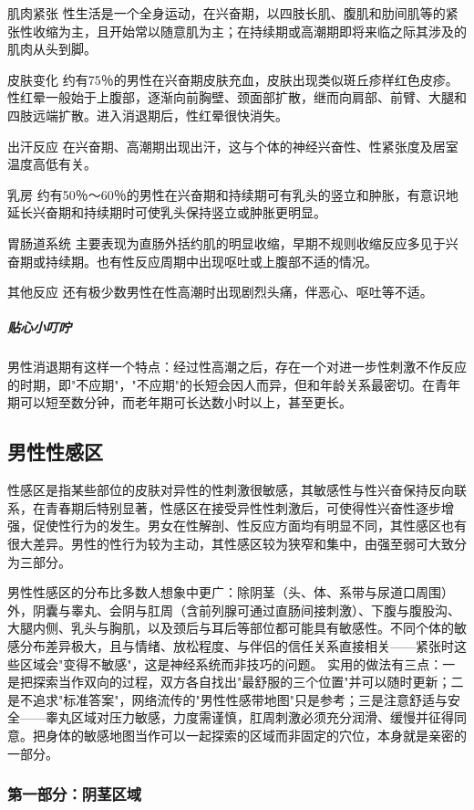 肌肉紧张
性生活是一个全身运动，在兴奋期，以四肢长肌、腹肌和肋间肌等的紧张性收缩为主，且开始常以随意肌为主；在持续期或高潮期即将来临之际其涉及的肌肉从头到脚。

皮肤变化
约有75％的男性在兴奋期皮肤充血，皮肤出现类似斑丘疹样红色皮疹。性红晕一般始于上腹部，逐渐向前胸壁、颈面部扩散，继而向肩部、前臂、大腿和四肢远端扩散。进入消退期后，性红晕很快消失。

出汗反应
在兴奋期、高潮期出现出汗，这与个体的神经兴奋性、性紧张度及居室温度高低有关。

乳房
约有50％～60％的男性在兴奋期和持续期可有乳头的竖立和肿胀，有意识地延长兴奋期和持续期时可使乳头保持竖立或肿胀更明显。

胃肠道系统
主要表现为直肠外括约肌的明显收缩，早期不规则收缩反应多见于兴奋期或持续期。也有性反应周期中出现呕吐或上腹部不适的情况。

其他反应
还有极少数男性在性高潮时出现剧烈头痛，伴恶心、呕吐等不适。

\subparagraph{贴心小叮咛}

男性消退期有这样一个特点：经过性高潮之后，存在一个对进一步性刺激不作反应的时期，即"不应期"，"不应期"的长短会因人而异，但和年龄关系最密切。在青年期可以短至数分钟，而老年期可长达数小时以上，甚至更长。

\subsection{男性性感区}

性感区是指某些部位的皮肤对异性的性刺激很敏感，其敏感性与性兴奋保持反向联系，在青春期后特别显著，性感区在接受异性性刺激后，可使得性兴奋性逐步增强，促使性行为的发生。男女在性解剖、性反应方面均有明显不同，其性感区也有很大差异。男性的性行为较为主动，其性感区较为狭窄和集中，由强至弱可大致分为三部分。


男性性感区的分布比多数人想象中更广：除阴茎（头、体、系带与尿道口周围）外，阴囊与睾丸、会阴与肛周（含前列腺可通过直肠间接刺激）、下腹与腹股沟、大腿内侧、乳头与胸肌，以及颈后与耳后等部位都可能具有敏感性。不同个体的敏感分布差异极大，且与情绪、放松程度、与伴侣的信任关系直接相关——紧张时这些区域会"变得不敏感"，这是神经系统而非技巧的问题。
实用的做法有三点：一是把探索当作双向的过程，双方各自找出"最舒服的三个位置"并可以随时更新；二是不追求"标准答案"，网络流传的"男性性感带地图"只是参考；三是注意舒适与安全——睾丸区域对压力敏感，力度需谨慎，肛周刺激必须充分润滑、缓慢并征得同意。把身体的敏感地图当作可以一起探索的区域而非固定的穴位，本身就是亲密的一部分。

\subsubsection{第一部分：阴茎区域}

